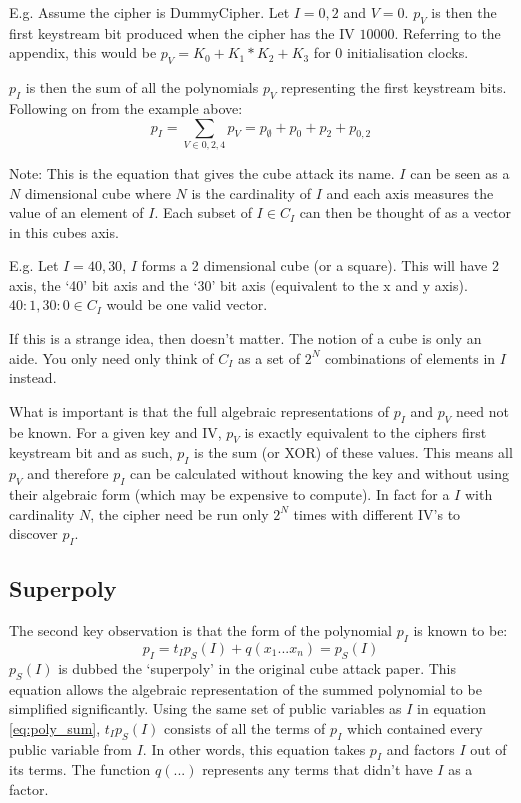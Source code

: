 \documentclass{report}
\let\Oldsubsection\subsection
\renewcommand{\subsection}{\FloatBarrier\Oldsubsection}
\begin{document}
E.g. Assume the cipher is DummyCipher. Let $I = {0,2}$ and $V = {0}$. $p_V$ is then the first keystream bit produced when the cipher has the IV $10000$. Referring to the appendix, this would be $p_V = K_0+K_1*K_2+K_3$ for 0 initialisation clocks.

$p_I$ is then the sum of all the polynomials $p_V$ representing the first keystream bits. Following on from the example above:
\begin{equation}\label{eq:poly_sum_eg}
p_I = \sum\limits_{V \in {0,2,4}} p_V  = p_{\emptyset} + p_{0} + p_2 + p_{0,2}
\end{equation}

Note: This is the equation that gives the cube attack its name. $I$ can be seen as a $N$ dimensional cube where $N$ is the cardinality of $I$ and each axis measures the value of an element of $I$. Each subset of $I \in C_I$ can then be thought of as a vector in this cubes axis.

E.g. Let $I = {40, 30}$, $I$ forms a 2 dimensional cube (or a square). This will have 2 axis, the `40' bit axis and the `30' bit axis (equivalent to the x and y axis). ${40:1, 30:0} \in C_I$ would be one valid vector.

\begin{figure}[h]
\end{figure}

If this is a strange idea, then doesn't matter. The notion of a cube is only an aide. You only need only think of $C_I$ as a set of $2^N$ combinations of elements in $I$ instead.

What is important is that the full algebraic representations of $p_I$ and $p_V$ need not be known. For a given key and IV, $p_V$ is exactly equivalent to the ciphers first keystream bit and as such, $p_I$ is the sum (or XOR) of these values. This means all $p_V$ and therefore $p_I$ can be calculated without knowing the key and without using their algebraic form (which may be expensive to compute). In fact for a $I$ with cardinality $N$, the cipher need be run only $2^N$ times with different IV's to discover $p_I$.

\subsection{Superpoly}
The second key observation is that the form of the polynomial $p_I$ is known to be:
\begin{equation} \label{eq:superpoly}
p_I = t_Ip_S(I)+q(x_1...x_n)=p_S(I)
\end{equation}
$p_S(I)$ is dubbed the `superpoly' in the original cube attack paper. This equation allows the algebraic representation of the summed polynomial to be simplified significantly. Using the same set of public variables as $I$ in equation \ref{eq:poly_sum}, $t_Ip_S(I)$ consists of all the terms of $p_I$ which contained every public variable from $I$. In other words, this equation takes $p_I$ and factors $I$ out of its terms. The function $q(...)$ represents any terms that didn't have $I$ as a factor.
\end{document}
